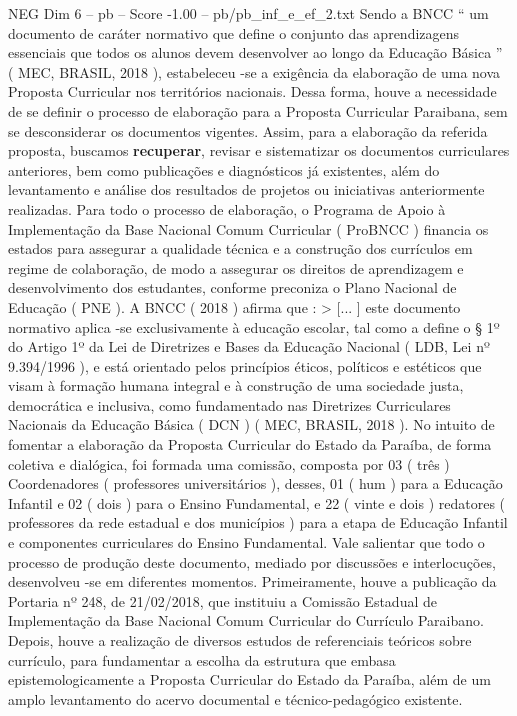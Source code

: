 \begin{textsample}{NEG Dim 6 – pb – Score -1.00 – pb/pb\_inf\_e\_ef\_2.txt}
Sendo a BNCC “ um documento de caráter normativo que define o conjunto das aprendizagens essenciais que todos os alunos devem desenvolver ao longo da Educação Básica ” ( MEC, BRASIL, 2018 ), estabeleceu -se a exigência da elaboração de uma nova Proposta Curricular nos territórios nacionais.
Dessa forma, houve a necessidade de se definir o processo de elaboração para a Proposta Curricular Paraibana, sem se desconsiderar os documentos vigentes.
Assim, para a elaboração da referida proposta, buscamos \textbf{recuperar}, revisar e sistematizar os documentos curriculares anteriores, bem como publicações e diagnósticos já existentes, além do levantamento e análise dos resultados de projetos ou iniciativas anteriormente realizadas.
Para todo o processo de elaboração, o Programa de Apoio à Implementação da Base Nacional Comum Curricular ( ProBNCC ) financia os estados para assegurar a qualidade técnica e a construção dos currículos em regime de colaboração, de modo a assegurar os direitos de aprendizagem e desenvolvimento dos estudantes, conforme preconiza o Plano Nacional de Educação ( PNE ).
A BNCC ( 2018 ) afirma que : > [... ] este documento normativo aplica -se exclusivamente à educação escolar, tal como a define o § 1º do Artigo 1º da Lei de Diretrizes e Bases da Educação Nacional ( LDB, Lei nº 9.394/1996 ), e está orientado pelos princípios éticos, políticos e estéticos que visam à formação humana integral e à construção de uma sociedade justa, democrática e inclusiva, como fundamentado nas Diretrizes Curriculares Nacionais da Educação Básica ( DCN ) ( MEC, BRASIL, 2018 ).
No intuito de fomentar a elaboração da Proposta Curricular do Estado da Paraíba, de forma coletiva e dialógica, foi formada uma comissão, composta por 03 ( três ) Coordenadores ( professores universitários ), desses, 01 ( hum ) para a Educação Infantil e 02 ( dois ) para o Ensino Fundamental, e 22 ( vinte e dois ) redatores ( professores da rede estadual e dos municípios ) para a etapa de Educação Infantil e componentes curriculares do Ensino Fundamental.
Vale salientar que todo o processo de produção deste documento, mediado por discussões e interlocuções, desenvolveu -se em diferentes momentos.
Primeiramente, houve a publicação da Portaria nº 248, de 21/02/2018, que instituiu a Comissão Estadual de Implementação da Base Nacional Comum Curricular do Currículo Paraibano.
Depois, houve a realização de diversos estudos de referenciais teóricos sobre currículo, para fundamentar a escolha da estrutura que embasa epistemologicamente a Proposta Curricular do Estado da Paraíba, além de um amplo levantamento do acervo documental e técnico-pedagógico existente.

\end{textsample}
